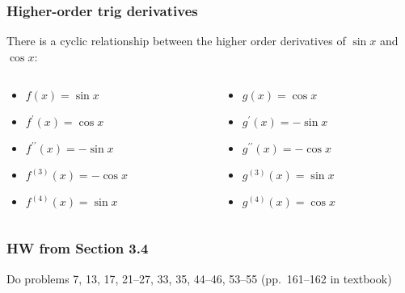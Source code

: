 \documentclass[14pt]{beamer}
\begin{document}
\begin{frame}

\frametitle{Higher-order trig derivatives}

There is a cyclic relationship between the higher order derivatives of $\sin x$ and $\cos x$:

\begin{columns}

\begin{column}{.5\textwidth}

\begin{block}

\begin{itemize}

\item[] $f(x)=\sin x$  
\item[] $f^{\prime}(x)=\cos x$ 
\item[] $f^{\prime\prime}(x)=-\sin x $
\item[] $f^{(3)}(x)=-\cos x $
\item[] $f^{(4)}(x)=\sin x $
\end{itemize}

\end{block}

\end{column}

\begin{column}{.5\textwidth}

\begin{block}

\begin{itemize}

\item[] $g(x)=\cos x$
\item[] $g^{\prime}(x)=-\sin x$
\item[] $g^{\prime\prime}(x)=-\cos x$
\item[] $g^{(3)}(x)=\sin x$
\item[] $g^{(4)}(x)=\cos x$

\end{itemize}

\end{block}

\end{column}

\end{columns}

\end{frame}

\begin{frame}
\frametitle{HW from Section 3.4}
Do problems 7, 13, 17, 21--27, 33, 35, 44--46, 53--55 (pp.\ 161--162 in textbook)
\end{frame}

\begin{comment}
\end{comment}
\end{document}
